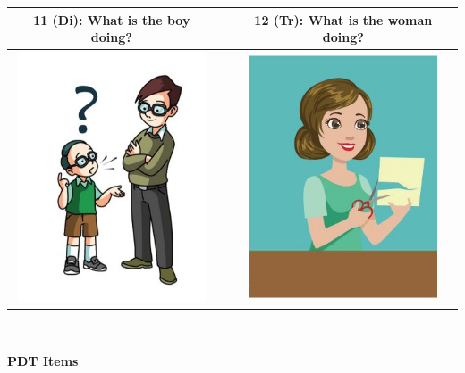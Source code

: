\begin{tabular}{|c|c|c|}
\hline
11 (Di): What is the boy doing? && 12 (Tr): What is the woman doing? \\
\hline
\includegraphics[width=15em,trim=0 0 0 -3]{figures/I11.jpg} & & \includegraphics[width=15em,trim=0 0 0 -3]{figures/I12.jpg} \\
\hline
\end{tabular}
\vspace{1em} \\


\clearpage

{\large \textbf{PDT Items}}

\vspace{2em}


